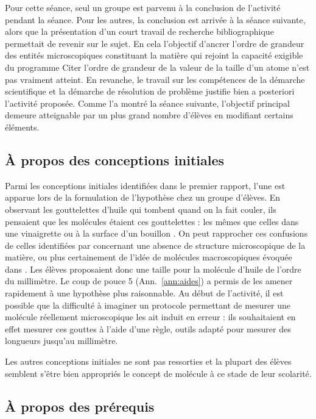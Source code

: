 \documentclass[12pt,a4paper, fleqn]{article}
\begin{document}
Pour cette séance, seul un groupe est parvenu à la conclusion de l'activité pendant la séance.
Pour les autres, la conclusion est arrivée à la séance suivante, alors que la présentation d'un court travail de recherche bibliographique permettait de revenir sur le sujet.
En cela l'objectif d'ancrer l'ordre de grandeur des entités microscopiques constituant la matière qui rejoint la capacité exigible du programme \og Citer l'ordre de grandeur de la valeur de la taille d'un atome \fg{} n'est pas vraiment atteint.
En revanche, le travail sur les compétences de la démarche scientifique et la démarche de résolution de problème justifie bien a posteriori l'activité proposée.
Comme l'a montré la séance suivante, l'objectif principal demeure atteignable par un plus grand nombre d'élèves en modifiant certains éléments.

\subsection{À propos des conceptions initiales}

Parmi les conceptions initiales identifiées dans le premier rapport, l'une est apparue lors de la formulation de l'hypothèse chez un groupe d'élèves.
En observant les gouttelettes d'huile qui tombent quand on la fait couler, ils pensaient que les molécules étaient ces gouttelettes : \og les mêmes que celles dans une vinaigrette ou à la surface d'un bouillon \fg{}.
On peut rapprocher ces confusions de celles identifiées par \cite{Bain1985} concernant une absence de structure microscopique de la matière, ou plus certainement de l'idée de molécules macroscopiques évoquée dans \cite{Griffiths1992}.
Les élèves proposaient donc une taille pour la molécule d'huile de l'ordre du millimètre.
Le coup de pouce 5 (Ann.~\ref{ann:aides}) a permis de les amener rapidement à une hypothèse plus raisonnable.
Au début de l'activité, il est possible que la difficulté à imaginer un protocole permettant de mesurer une molécule réellement microscopique les ait induit en erreur : ils souhaitaient en effet mesurer ces gouttes à l'aide d'une règle, outils adapté pour mesurer des longueurs jusqu'au millimètre.

Les autres conceptions initiales ne sont pas ressorties et la plupart des élèves semblent s'être bien appropriés le concept de molécule à ce stade de leur scolarité.

\subsection{À propos des prérequis}
\end{document}
